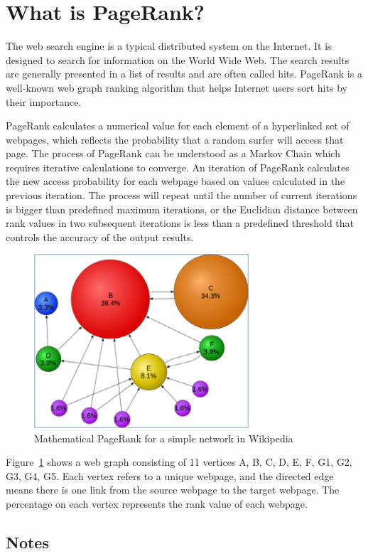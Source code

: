 \documentclass{article}
\begin{document}
\section{What is PageRank?}
The web search engine is a typical distributed system on the Internet. It is designed to search for information on the World Wide Web. The search results are generally presented in a list of results and are often called hits. PageRank is a well-known web graph ranking algorithm that helps Internet users sort hits by their importance. 

PageRank calculates a numerical value for each element of a hyperlinked set of webpages, which reflects the probability that a random surfer will access that page. The process of PageRank can be understood as a Markov Chain which requires iterative calculations to converge. An iteration of PageRank calculates the new access probability for each webpage based on values calculated in the previous iteration. The process will repeat until the number of current iterations is bigger than predefined maximum iterations, or the Euclidian distance between rank values in two subsequent iterations is less than a predefined threshold that controls the accuracy of the output results. 

\begin{figure}[!htbp]
\centering
\includegraphics[width=8cm]{pagerankexample}
\caption{Mathematical PageRank for a simple network in Wikipedia}
\label{fig:pagerankexample}
\end{figure}

Figure~\ref{fig:pagerankexample} shows a web graph consisting of 11 vertices {A, B, C, D, E, F, G1, G2, G3, G4, G5}. Each vertex refers to a unique webpage, and the directed edge means there is one link from the source webpage to the target webpage. The percentage on each vertex represents the rank value of each webpage.

\subsection*{Notes}
\end{document}
